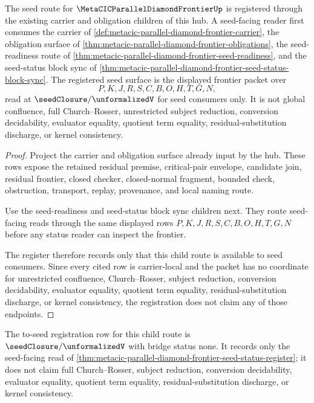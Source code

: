 \begin{theorem}
\label{thm:metacic-parallel-diamond-frontier-seed-status-register}
The seed route for $\MetaCICParallelDiamondFrontierUp$ is registered through the existing carrier and obligation children of this hub. A seed-facing reader first consumes the carrier of \autoref{def:metacic-parallel-diamond-frontier-carrier}, the obligation surface of \autoref{thm:metacic-parallel-diamond-frontier-obligations}, the seed-readiness route of \autoref{thm:metacic-parallel-diamond-frontier-seed-readiness}, and the seed-status block sync of \autoref{thm:metacic-parallel-diamond-frontier-seed-status-block-sync}. The registered seed surface is the displayed frontier packet over
$$
P,K,J,R,S,C,B,O,H,T,G,N ,
$$
read at $\seedClosure/\unformalizedV$ for seed consumers only. It is not global confluence, full Church--Rosser, unrestricted subject reduction, conversion decidability, evaluator equality, quotient term equality, residual-substitution discharge, or kernel consistency.
\end{theorem}
\begin{proof}
Project the carrier and obligation surface already input by the hub. These rows expose the retained residual premise, critical-pair envelope, candidate join, residual frontier, closed checker, closed-normal fragment, bounded check, obstruction, transport, replay, provenance, and local naming route.

Use the seed-readiness and seed-status block sync children next. They route seed-facing reads through the same displayed rows $P,K,J,R,S,C,B,O,H,T,G,N$ before any status reader can inspect the frontier.

The register therefore records only that this child route is available to seed consumers. Since every cited row is carrier-local and the packet has no coordinate for unrestricted confluence, Church--Rosser, subject reduction, conversion decidability, evaluator equality, quotient term equality, residual-substitution discharge, or kernel consistency, the registration does not claim any of those endpoints.
\end{proof}

The to-seed registration row for this child route is $\seedClosure/\unformalizedV$ with bridge status none. It records only the seed-facing read of \autoref{thm:metacic-parallel-diamond-frontier-seed-status-register}; it does not claim full Church--Rosser, subject reduction, conversion decidability, evaluator equality, quotient term equality, residual-substitution discharge, or kernel consistency.

